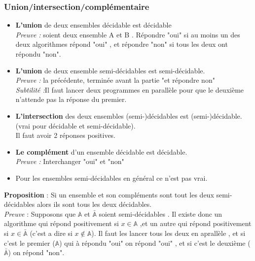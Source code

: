 \documentclass[base.tex]{subfiles}
\begin{document}
\subsubsection{Union/intersection/complémentaire}
\begin{itemize}
\item \textbf{L'union} de deux ensembles décidable est décidable \\
  \emph{Preuve :} soient deux ensemble A et B . Répondre "oui" si au moins un des deux algorithmes répond "oui" , et répondre "non" si tous les deux ont répondu "non".
\item \textbf{L'union} de deux ensemble semi-décidables est semi-décidable.\\
  \emph{Preuve :} la précédente, terminée avant la partie "et répondre non"\\
  \emph{Subtilité :}Il faut lancer deux programmes en parallèle pour que le deuxième n'attende pas la réponse du premier.
\item \textbf{L'intersection} des deux ensembles (semi-)décidables est (semi-)décidable. (vrai pour décidable et semi-décidable).\\
  Il faut avoir 2 réponses positives.
\item \textbf{Le complément} d'un ensemble décidable est décidable.\\
  \emph{Preuve :} Interchanger "oui" et "non"
\item Pour les ensembles semi-décidables en général ce n'est pas vrai.
\end{itemize}
\medskip
\textbf{Proposition} : Si un ensemble et son compléments sont tout les deux semi-décidables alors ils sont tous les deux décidables.\\
\emph{Preuve} : Supposons que $\mathbb{A}$ et $\bar{\mathbb{A}}$ soient semi-décidables . Il existe donc un algorithme qui répond positivement si $x \in \mathbb{A}$ ,et un autre qui répond positivement si $x\in \bar{\mathbb{A}}$ (c'est a dire si $x \not\in \mathbb{A}$). Il faut les lancer tous les deux en aprallèle , et si c'est le premier ($\mathbb{A}$) qui à répondu "oui" on répond "oui" , et si c'est le deuxième ($\bar{\mathbb{A}}$) on répond "non".
\end{document}
